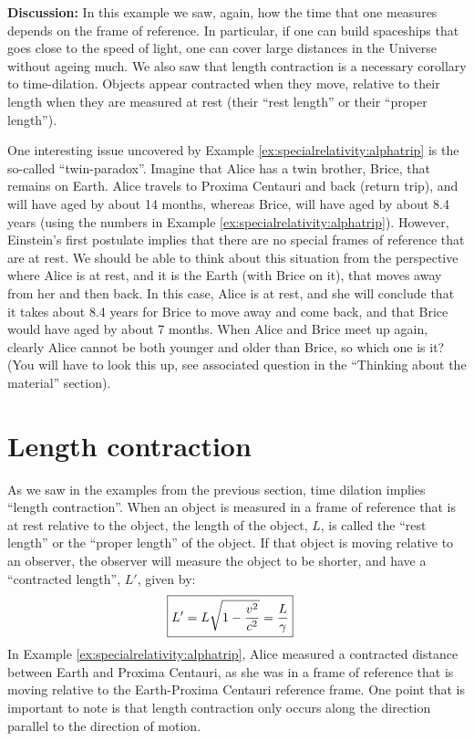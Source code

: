 \begin{example}
\textbf{Discussion: }In this example we saw, again, how the time that one measures depends on the frame of reference. In particular, if one can build spaceships that goes close to the speed of light, one can cover large distances in the Universe without ageing much. We also saw that length contraction is a necessary corollary to time-dilation. Objects appear contracted when they move, relative to their length when they are measured at rest (their ``rest length'' or their ``proper length'').
\end{example}
One interesting issue uncovered by Example \ref{ex:specialrelativity:alphatrip} is the so-called ``twin-paradox''. Imagine that Alice has a twin brother, Brice, that remains on Earth. Alice travels to Proxima Centauri and back (return trip), and will have aged by about 14 months, whereas Brice, will have aged by about 8.4 years (using the numbers in Example \ref{ex:specialrelativity:alphatrip}). However, Einstein's first postulate implies that there are no special frames of reference that are at rest. We should be able to think about this situation from the perspective where Alice is at rest, and it is the Earth (with Brice on it), that moves away from her and then back. In this case, Alice is at rest, and she will conclude that it takes about 8.4 years for Brice to move away and come back, and that Brice would have aged by about 7 months. When Alice and Brice meet up again, clearly Alice cannot be both younger and older than Brice, so which one is it? (You will have to look this up, see associated question in the ``Thinking about the material'' section).

\section{Length contraction}
As we saw in the examples from the previous section, time dilation implies ``length contraction''. When an object is measured in a frame of reference that is at rest relative to the object, the length of the object, $L$, is called the ``rest length'' or the ``proper length'' of the object. If that object is moving relative to an observer, the observer will measure the object to be shorter, and have a ``contracted length'', $L'$, given by:
\begin{align*}
\Aboxed{L'=L\sqrt{1-\frac{v^2}{c^2}} =\frac{L}{\gamma}}
\end{align*}
In Example \ref{ex:specialrelativity:alphatrip}, Alice measured a contracted distance between Earth and Proxima Centauri, as she was in a frame of reference that is moving relative to the Earth-Proxima Centauri reference frame. One point that is important to note is that length contraction only occurs along the direction parallel to the direction of motion.

